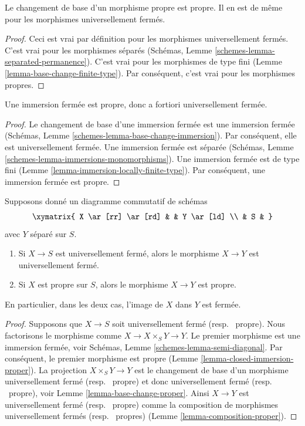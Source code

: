 \begin{lemma}
\label{lemma-base-change-proper}
Le changement de base d'un morphisme propre est propre. Il
en est de même pour les morphismes universellement fermés.
\end{lemma}

\begin{proof}
Ceci est vrai par définition pour les morphismes universellement
fermés. C'est vrai pour les
morphismes séparés (Schémas, Lemme \ref{schemes-lemma-separated-permanence}). C'est
vrai pour les morphismes de type fini
(Lemme \ref{lemma-base-change-finite-type}). Par conséquent, c'est
vrai pour les morphismes propres.
\end{proof}

\begin{lemma}
\label{lemma-closed-immersion-proper}
Une immersion fermée est propre, donc a fortiori universellement fermée.
\end{lemma}

\begin{proof}
Le changement de base d'une immersion fermée est une
immersion fermée (Schémas, Lemme \ref{schemes-lemma-base-change-immersion}). Par conséquent,
elle est universellement
fermée. Une immersion
fermée est séparée (Schémas, Lemme \ref{schemes-lemma-immersions-monomorphisms}). Une
immersion fermée est de type
fini (Lemme \ref{lemma-immersion-locally-finite-type}). Par conséquent, une
immersion fermée est propre.
\end{proof}

\begin{lemma}
\label{lemma-image-proper-scheme-closed}
Supposons donné un diagramme commutatif de schémas
$$
\xymatrix{
X \ar[rr] \ar[rd] & &
Y \ar[ld] \\
& S &
}
$$
avec $Y$ séparé sur $S$.
\begin{enumerate}
\item Si $X \to S$ est universellement fermé, alors le morphisme $X \to Y$
est universellement fermé.
\item Si $X$ est propre sur $S$, alors le morphisme $X \to Y$ est propre.
\end{enumerate}
En particulier, dans les deux cas, l'image de $X$ dans $Y$ est fermée.
\end{lemma}

\begin{proof}
Supposons que $X \to S$ soit universellement fermé (resp. \ propre).
Nous factorisons le morphisme comme
$X \to X \times_S Y \to Y$. Le premier morphisme est une immersion
fermée, voir Schémas, Lemme \ref{schemes-lemma-semi-diagonal}. Par
conséquent, le premier morphisme est propre (Lemme \ref{lemma-closed-immersion-proper}). La projection $X \times_S Y \to Y$
est le changement de base d'un morphisme universellement
fermé (resp. \ propre) et donc universellement
fermé (resp. \ propre), voir Lemme \ref{lemma-base-change-proper}. Ainsi $X \to Y$
est universellement fermé (resp. \ propre) comme la composition
de morphismes universellement fermés (resp.
\ propres) (Lemme \ref{lemma-composition-proper}).
\end{proof}

